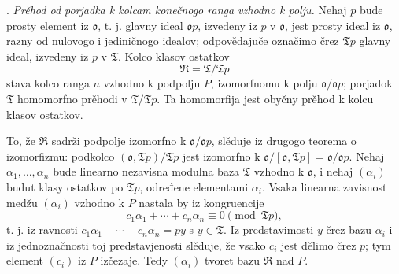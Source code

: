 \documentclass[11pt]{article}
\newcommand{\mo}{\mathfrak{o}}
\newcommand{\mT}{\mathfrak{T}}
\newcommand{\mR}{\mathfrak{R}}
\begin{document}
\setcounter{footnote}{28}

. \emph{Prěhod od porjadka k kolcam konečnogo ranga vzhodno k polju.}
Nehaj $p$ bude prosty element iz $\mo$, t. j. glavny ideal $\mo p$, izvedeny iz $p$ v $\mo$, jest prosty ideal iz $\mo$, razny od nulovogo i jediničnogo idealov; odpovědajuče označimo črez $\mT p$ glavny ideal, izvedeny iz $p$ v $\mT$. Kolco klasov ostatkov
\[
        \mR=\mT/\mT p
\]
stava kolco ranga $n$ vzhodno k podpolju $P$, izomorfnomu k polju $\mo/\mo p$; porjadok $\mT$ homomorfno prěhodi v $\mT/\mT p$. Ta homomorfija jest obyčny prěhod k kolcu klasov ostatkov.

To, že $\mR$ sadrži podpolje izomorfno k $\mo/\mo p$, slěduje iz drugogo teorema o izomorfizmu: podkolco $(\mo,\mT p)/\mT p$ jest izomorfno k $\mo/[\mo,\mT p]=\mo/\mo p$. Nehaj $\alpha_1,\ldots,\alpha_n$ bude linearno nezavisna modulna baza $\mT$ vzhodno k $\mo$, i nehaj $(\alpha_i)$ budut klasy ostatkov po $\mT p$, određene elementami $\alpha_i$. Vsaka linearna zavisnost medžu $(\alpha_i)$ vzhodno k $P$ nastala by iz kongruencije
\[
        c_1\alpha_1+\cdots+c_n\alpha_n\equiv0\pmod{\mT p},
\]
t. j. iz ravnosti $c_1\alpha_1+\cdots+c_n\alpha_n=py$ s $y\in\mT$. Iz predstavimosti $y$ črez bazu $\alpha_i$ i iz jednoznačnosti toj predstavjenosti slěduje, že vsako $c_i$ jest dělimo črez $p$; tym element $(c_i)$ iz $P$ izčezaje. Tedy $(\alpha_i)$ tvoret bazu $\mR$ nad $P$.
\end{document}
